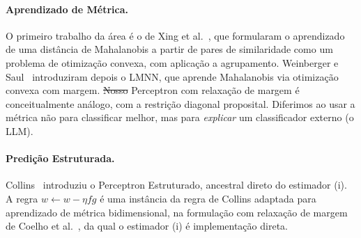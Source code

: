 \documentclass[12pt,a4paper]{article}
\makeatletter
\providecommand{\DIFaddtex}[1]{{\protect\color{blue}\uwave{#1}}} %
\providecommand{\DIFdeltex}[1]{{\protect\color{red}\sout{#1}}} %
\providecommand{\DIFaddbegin}{} %
\providecommand{\DIFaddend}{} %
\providecommand{\DIFdelbegin}{} %
\providecommand{\DIFdelend}{} %
\providecommand{\DIFadd}[1]{\texorpdfstring{\DIFaddtex{#1}}{#1}} %
\providecommand{\DIFdel}[1]{\texorpdfstring{\DIFdeltex{#1}}{}} %
\providecommand{\DIFscaledelfig}{0.5}
\newlength{\DIFdelgraphicswidth} %
\newlength{\DIFdelgraphicsheight} %
\providecommand{\DIFaddincludegraphics}[2][]{{\color{blue}\fbox{\DIFOincludegraphics[#1]{#2}}}} %
\providecommand{\DIFdelincludegraphics}[2][]{%
\sbox{\DIFdelgraphicsbox}{\DIFOincludegraphics[#1]{#2}}%
\settoboxwidth{\DIFdelgraphicswidth}{\DIFdelgraphicsbox} %
\settoboxtotalheight{\DIFdelgraphicsheight}{\DIFdelgraphicsbox} %
\scalebox{\DIFscaledelfig}{%
\parbox[b]{\DIFdelgraphicswidth}{\usebox{\DIFdelgraphicsbox}\\[-\baselineskip] \rule{\DIFdelgraphicswidth}{0em}}\llap{\resizebox{\DIFdelgraphicswidth}{\DIFdelgraphicsheight}{%
\setlength{\unitlength}{\DIFdelgraphicswidth}%
\begin{picture}(1,1)%
\thicklines\linethickness{2pt} %
{\color[rgb]{1,0,0}\put(0,0){\framebox(1,1){}}}%
{\color[rgb]{1,0,0}\put(0,0){\line( 1,1){1}}}%
{\color[rgb]{1,0,0}\put(0,1){\line(1,-1){1}}}%
\end{picture}%
}\hspace*{3pt}}} %
} %
\DeclareRobustCommand{\DIFaddbegin}{\DIFOaddbegin \let\includegraphics\DIFaddincludegraphics} %
\DeclareRobustCommand{\DIFaddend}{\DIFOaddend \let\includegraphics\DIFOincludegraphics} %
\DeclareRobustCommand{\DIFdelbegin}{\DIFOdelbegin \let\includegraphics\DIFdelincludegraphics} %
\DeclareRobustCommand{\DIFdelend}{\DIFOaddend \let\includegraphics\DIFOincludegraphics} %
\let\sout@orig\sout %
\renewcommand{\sout}[1]{\ifmmode\text{\sout@orig{\ensuremath{#1}}}\else\sout@orig{#1}\fi} %
\makeatother
\begin{document}
\paragraph{Aprendizado de Métrica.}
O primeiro trabalho da área é o de Xing et al.~\cite{xingDistanceMetric2002}, que
formularam o aprendizado de uma distância de Mahalanobis a partir de pares de
similaridade como um problema de otimização convexa, com aplicação a agrupamento.
Weinberger e Saul~\cite{weinbergerDistanceMetric2009} introduziram depois o LMNN, que
aprende
Mahalanobis via otimização convexa com margem. \DIFdelbegin \DIFdel{Nosso }\DIFdelend \DIFaddbegin \DIFadd{O }\DIFaddend Perceptron com relaxação de margem \DIFaddbegin \DIFadd{aqui
utilizado }\DIFaddend é
conceitualmente análogo, com a restrição diagonal proposital. Diferimos ao usar a métrica
não para classificar melhor, mas para \emph{explicar} um classificador externo (o LLM).

\paragraph{Predição Estruturada.}
Collins~\cite{collinsDiscriminativeTraining2002} introduziu o Perceptron Estruturado,
ancestral direto do estimador (i). A regra $w \leftarrow w - \eta f g$ é uma instância da
regra de Collins adaptada para aprendizado de métrica bidimensional, na formulação com
relaxação de margem de Coelho et al.~\cite{coelhoPredicaoEstruturada2017}, da qual o
estimador (i) é implementação direta.
\end{document}
